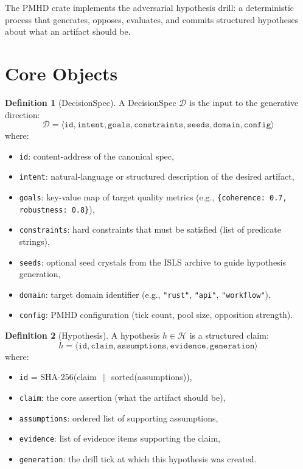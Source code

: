 \documentclass[11pt,a4paper,twoside]{article}
\theoremstyle{definition}
\newtheorem{definition}{Definition}[section]
\theoremstyle{plain}
\theoremstyle{remark}
\newcommand{\ISLS}{\textsf{ISLS}}
\newcommand{\calH}{\mathcal{H}}
\newcommand{\calD}{\mathcal{D}}
\begin{document}
The PMHD crate implements the adversarial hypothesis drill: a
deterministic process that generates, opposes, evaluates, and commits
structured hypotheses about what an artifact should be.


\section{Core Objects}\label{sec:pmhd:objects}

\begin{definition}[DecisionSpec]\label{def:decisionspec}
A DecisionSpec $\calD$ is the input to the generative direction:
\[
  \calD = \langle \mathtt{id}, \mathtt{intent}, \mathtt{goals},
          \mathtt{constraints}, \mathtt{seeds},
          \mathtt{domain}, \mathtt{config} \rangle
\]
where:
\begin{itemize}[nosep]
  \item \texttt{id}: content-address of the canonical spec,
  \item \texttt{intent}: natural-language or structured description of
        the desired artifact,
  \item \texttt{goals}: key-value map of target quality metrics
        (e.g., \texttt{\{coherence: 0.7, robustness: 0.8\}}),
  \item \texttt{constraints}: hard constraints that must be satisfied
        (list of predicate strings),
  \item \texttt{seeds}: optional seed crystals from the \ISLS{} archive
        to guide hypothesis generation,
  \item \texttt{domain}: target domain identifier
        (e.g., \texttt{"rust"}, \texttt{"api"}, \texttt{"workflow"}),
  \item \texttt{config}: PMHD configuration (tick count, pool size,
        opposition strength).
\end{itemize}
\end{definition}

\begin{definition}[Hypothesis]\label{def:hypothesis}
A hypothesis $h \in \calH$ is a structured claim:
\[
  h = \langle \mathtt{id}, \mathtt{claim}, \mathtt{assumptions},
      \mathtt{evidence}, \mathtt{generation} \rangle
\]
where:
\begin{itemize}[nosep]
  \item \texttt{id} = SHA-256(claim $\|$ sorted(assumptions)),
  \item \texttt{claim}: the core assertion (what the artifact should be),
  \item \texttt{assumptions}: ordered list of supporting assumptions,
  \item \texttt{evidence}: list of evidence items supporting the claim,
  \item \texttt{generation}: the drill tick at which this hypothesis
        was created.
\end{itemize}
\end{definition}
\end{document}
